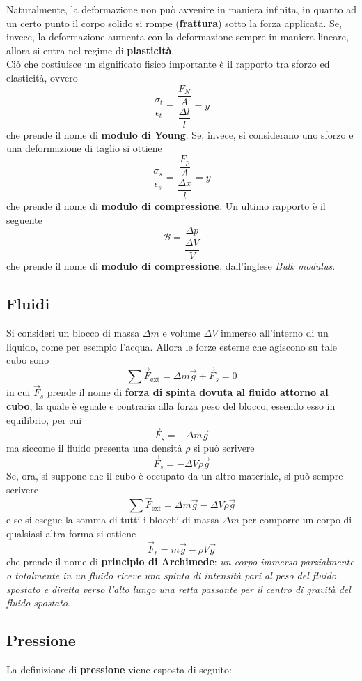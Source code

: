 \documentclass[a4paper]{extarticle}
\begin{document}
\noindent
Naturalmente, la deformazione non può avvenire in maniera infinita, in quanto ad un certo punto il corpo solido si rompe (\textbf{frattura}) sotto la forza applicata. Se, invece, la deformazione aumenta con la deformazione sempre in maniera lineare, allora si entra nel regime di \textbf{plasticità}.\\
Ciò che costiuisce un significato fisico importante è il rapporto tra sforzo ed elasticità, ovvero
\[\frac{\sigma_t}{\epsilon_t} = \frac{\dfrac{F_N}{A}}{\dfrac{\Delta l}{l}} = y\]
che prende il nome di \textbf{modulo di Young}. Se, invece, si considerano uno sforzo e una deformazione di taglio si ottiene
\[\frac{\sigma_s}{\epsilon_s} = \frac{\dfrac{F_p}{A}}{\dfrac{\Delta x}{l}} = y\]
che prende il nome di \textbf{modulo di compressione}. Un ultimo rapporto è il seguente
\[\mathcal{B}=\frac{\Delta p}{\dfrac{\Delta V}{V}}\]
che prende il nome di \textbf{modulo di compressione}, dall'inglese \emph{Bulk modulus}.

\vspace{1em}
\subsection{Fluidi}
Si consideri un blocco di massa $\Delta m$ e volume $\Delta V$ immerso all'interno di un liquido, come per esempio l'acqua. Allora le forze esterne che agiscono su tale cubo sono
\[\sum \vec F_{\text{ext}} = \Delta m \vec g + \vec F_s = 0\]
in cui $\vec F_s$ prende il nome di \textbf{forza di spinta dovuta al fluido attorno al cubo}, la quale è eguale e contraria alla forza peso del blocco, essendo esso in equilibrio, per cui
\[\vec F_s = - \Delta m \vec g\]
ma siccome il fluido presenta una densità $\rho$ si può scrivere
\[\vec F_s = - \Delta V \rho \vec g\]
Se, ora, si suppone che il cubo è occupato da un altro materiale, si può sempre scrivere
\[\sum \vec F_{\text{ext}} = \Delta m \vec g - \Delta V \rho \vec g\]
e se si esegue la somma di tutti i blocchi di massa $\Delta m$ per comporre un corpo di qualsiasi altra forma si ottiene
\[\boxed{\vec F_r = m \vec g - \rho V \vec g}\]
che prende il nome di \textbf{principio di Archimede}: \emph{un corpo immerso parzialmente o totalmente in un fluido riceve una spinta di intensità pari al peso del fluido spostato e diretta verso l'alto lungo una retta passante per il centro di gravità del fluido spostato}.

\vspace{1em}
\subsection{Pressione}
La definizione di \textbf{pressione} viene esposta di seguito:
\end{document}
